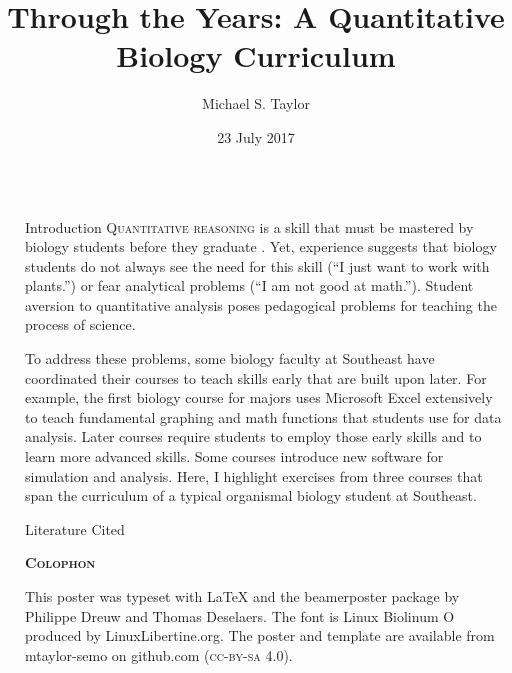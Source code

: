 \documentclass[final,hyperref={pdfpagelabels=false}]{beamer}
\title[Analysis in the Classroom]{Through the Years: A Quantitative Biology Curriculum}
\author[Taylor]{Michael S. Taylor}
\institute[SEMO]{Department of Biology}
\date{23 July 2017}
\newcommand{\whitespace}{\vspace{0.5\baselineskip}}
\newlength{\sepwid}
\newlength{\onecolwid}
\begin{document}

\begin{frame}[t]
\begin{columns}[t]
	\begin{column}{\sepwid} %
	\end{column}
	\begin{column}{\onecolwid}
    	\begin{block}{Introduction}
    		\textsc{Quantitative reasoning} is a skill that must be mastered by biology students before they graduate \citetext{; ; \citealp{hurney2011closing}}. Yet, experience suggests that biology students do not always see the need for this skill (“I just want to work with plants.”) or fear analytical problems (“I am not good at math.”). Student aversion to quantitative analysis poses pedagogical problems for teaching the process of science.
    		
    		\whitespace

			To address these problems, some biology faculty at Southeast have coordinated their courses to teach skills early that are built upon later. For example, the first  biology course for majors uses Microsoft Excel extensively to teach fundamental graphing and math functions that students use for data analysis. Later courses require students to employ those early skills and to learn more advanced skills. Some courses introduce new software for simulation and analysis. Here, I highlight exercises from three courses that span the curriculum of a typical organismal biology student at Southeast.  
    	\end{block}

		\vspace*{\sepwid}

		\begin{block}{Literature Cited}
			\setlength{\bibhang}{0.5em}
			
			\raggedright
			{\small }
		\end{block}

		\vspace*{0.5\sepwid}
		
		\textcolor{river}{\textbf{\textsc{Colophon}}}
		
			{\justifying\small This poster was typeset with \LaTeX{} and the beamerposter package by Philippe Dreuw and Thomas Deselaers. The font is Linux Biolinum O produced by LinuxLibertine.org. The poster and template are available from mtaylor-semo on github.com (\textsc{cc-by-sa 4.0}).}
		


\end{column}
\end{columns}
\end{frame}
\end{document}
